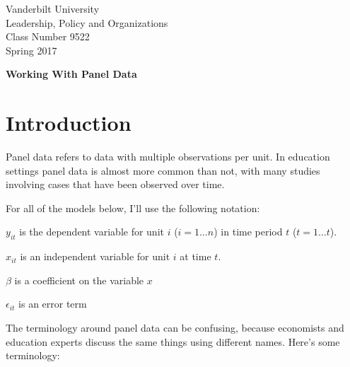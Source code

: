 \documentclass[12pt]{article}
\begin{document}
\thispagestyle{empty}%

\setlength{\parskip}{1ex plus 0.5ex minus 0.2ex}

\setcounter{secnumdepth}{-2}


\begin{flushleft}
Vanderbilt University\\Leadership, Policy and Organizations\\Class Number 9522\\ Spring 2017
\end{flushleft}

\begin{center}
\textbf{Working With Panel Data}
\end{center}

\section{Introduction}

Panel data refers to data with multiple observations per unit. In
education settings panel data is almost more common than not, with
many studies involving cases that have been observed over time.

For all of the models below, I'll use the following notation:

$y_{it}$ is the dependent variable for unit $i$ ($i=1 \ldots n$) in time period $t$ ($t= 1 \ldots t$). 

$x_{it}$ is an independent variable for unit $i$ at time $t$. 

$\beta$ is a coefficient on the variable $x$

$\epsilon_{it}$ is an error term


The terminology around panel data can be confusing, because economists
and education experts discuss the same things using different
names. Here's some terminology:
\end{document}
